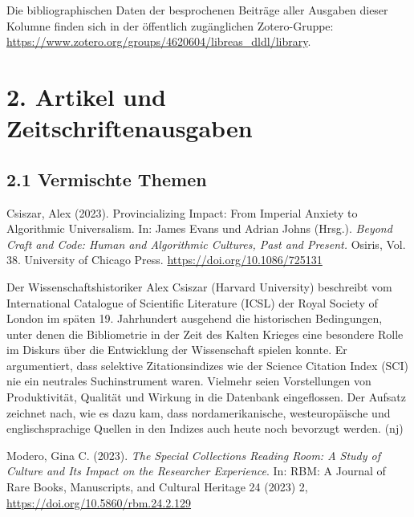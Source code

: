 \documentclass[a4paper,
fontsize=11pt,
oneside,
numbers=noperiodatend,
parskip=half-,
bibliography=totoc,
final
]{scrartcl}
\begin{document}
Die bibliographischen Daten der besprochenen Beiträge aller Ausgaben
dieser Kolumne finden sich in der öffentlich zugänglichen Zotero-Gruppe:
\url{https://www.zotero.org/groups/4620604/libreas_dldl/library}.

\hypertarget{artikel-und-zeitschriftenausgaben}{%
\section{2. Artikel und
Zeitschriftenausgaben}\label{artikel-und-zeitschriftenausgaben}}

\hypertarget{vermischte-themen}{%
\subsection{2.1 Vermischte Themen}\label{vermischte-themen}}

Csiszar, Alex (2023). Provincializing Impact: From Imperial Anxiety to
Algorithmic Universalism. In: James Evans und Adrian Johns (Hrsg.).
\emph{Beyond Craft and Code: Human and Algorithmic Cultures, Past and
Present.} Osiris, Vol. 38. University of Chicago Press.
\url{https://doi.org/10.1086/725131}

Der Wissenschaftshistoriker Alex Csiszar (Harvard University) beschreibt
vom International Catalogue of Scientific Literature (ICSL) der Royal
Society of London im späten 19. Jahrhundert ausgehend die historischen
Bedingungen, unter denen die Bibliometrie in der Zeit des Kalten Krieges
eine besondere Rolle im Diskurs über die Entwicklung der Wissenschaft
spielen konnte. Er argumentiert, dass selektive Zitationsindizes wie der
Science Citation Index (SCI) nie ein neutrales Suchinstrument waren.
Vielmehr seien Vorstellungen von Produktivität, Qualität und Wirkung in
die Datenbank eingeflossen. Der Aufsatz zeichnet nach, wie es dazu kam,
dass nordamerikanische, westeuropäische und englischsprachige Quellen in
den Indizes auch heute noch bevorzugt werden. (nj)

Modero, Gina C. (2023). \emph{The Special Collections Reading Room: A
Study of Culture and Its Impact on the Researcher Experience}. In: RBM:
A Journal of Rare Books, Manuscripts, and Cultural Heritage 24 (2023) 2,
\url{https://doi.org/10.5860/rbm.24.2.129}
\end{document}
